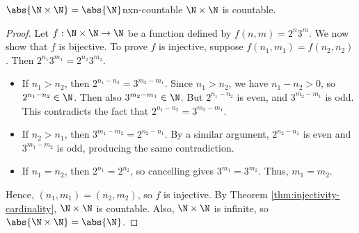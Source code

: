 \begin{thmbox}{$\abs{\N \times \N} = \abs{\N}$}{nxn-countable}
    $\N \times \N$ is countable.
    \tcblower
    \begin{proof}
        Let $f : \N \times \N \to \N$ be a function defined by $f(n,m) = 2^n 3^m$. We now show that $f$ is bijective. To prove $f$ is injective, suppose $f(n_1, m_1) = f(n_2, n_2)$. Then $2^{n_1} 3^{m_1} = 2^{n_2} 3^{m_2}$.
        \begin{itemize}
            \item If $n_1 > n_2$, then $2^{n_1 - n_2} = 3^{m_2 - m_1}$. Since $n_1 > n_2$, we have $n_1 - n_2 > 0$, so $2^{n_1 - n_2} \in \N$. Then also $3^{m_2 - m_1} \in \N$. But $2^{n_1 - n_2}$ is even, and $3^{m_2 - m_1}$ is odd. This contradicts the fact that $2^{n_1 - n_2} = 3^{m_2 - m_1}$.
            \item If $n_2 > n_1$, then $3^{m_1 - m_2} = 2^{n_2 - n_1}$. By a similar argument, $2^{n_2 - n_1}$ is even and $3^{m_1 - m_2}$ is odd, producing the same contradiction.
            \item If $n_1 = n_2$, then $2^{n_1} = 2^{n_2}$, so cancelling gives $3^{m_1} = 3^{m_2}$. Thus, $m_1 = m_2$.
        \end{itemize}
        Hence, $(n_1, m_1) = (n_2, m_2)$, so $f$ is injective.
        By Theorem \ref{thm:injectivity-cardinality}, $\N \times \N$ is countable. Also, $\N \times \N$ is infinite, so $\abs{\N \times \N} = \abs{\N}$.
    \end{proof}
\end{thmbox}


